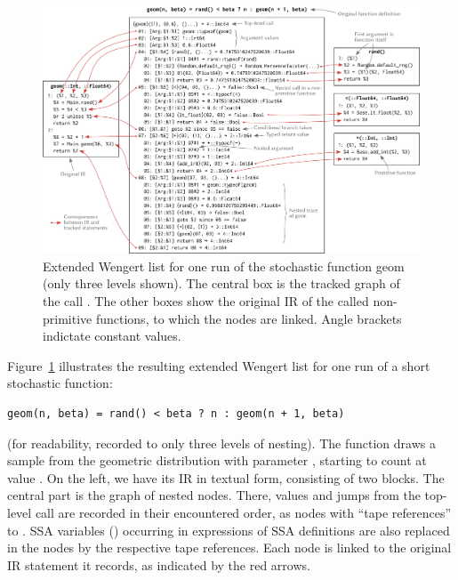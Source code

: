 \begin{figure}[t]
  \centering
  \includegraphics[width=\textwidth]{figures/wengert-list}
  \caption{Extended Wengert list for one run of the stochastic function geom (only three levels
    shown). The central box is the tracked graph of the call \protect{}. The other
    boxes show the original IR of the called non-primitive functions, to which the nodes are
    linked.  Angle brackets indictate constant values.}
  \label{fig:ext-wengert-list}
\end{figure}

Figure~\ref{fig:ext-wengert-list} illustrates the resulting extended Wengert list for one run of a
short stochastic function:
\begin{lstlisting}
geom(n, beta) = rand() < beta ? n : geom(n + 1, beta)
\end{lstlisting}
(for readability, recorded to only three levels of nesting).  The function draws a sample from the
geometric distribution with parameter , starting to count at value . On the
left, we have its IR in textual form, consisting of two blocks. The central part is the graph of
nested nodes.  There, values and jumps from the top-level call are recorded in their encountered
order, as nodes with \enquote{tape references}  to . SSA variables ()
occurring in expressions of SSA definitions are also replaced in the nodes by the respective tape
references.  Each node is linked to the original IR statement it records, as indicated by the red
arrows.

